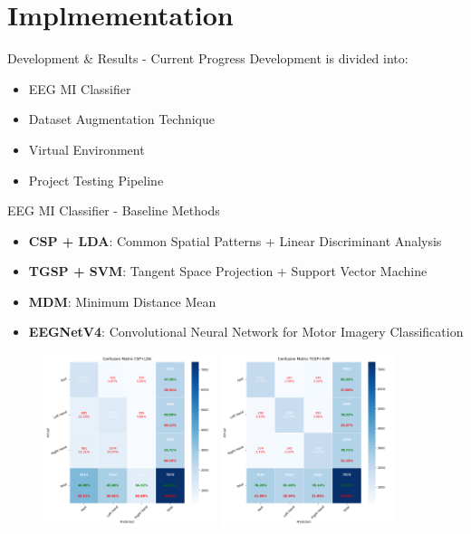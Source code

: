 \section{Implmementation}
\begin{frame}{Development \& Results - Current Progress}
Development is divided into:
\begin{itemize}
    \item EEG MI Classifier
    \item Dataset Augmentation Technique
    \item Virtual Environment
    \item Project Testing Pipeline
\end{itemize}
\end{frame}

\begin{frame}{EEG MI Classifier - Baseline Methods}
    \begin{minipage}[c]{.65\textwidth}
        \begin{itemize}
            \item \textbf{CSP + LDA}: Common Spatial Patterns + Linear Discriminant Analysis
            \item \textbf{TGSP + SVM}: Tangent Space Projection + Support Vector Machine
            \item \textbf{MDM}: Minimum Distance Mean
            \item \textbf{EEGNetV4}: Convolutional Neural Network for Motor Imagery Classification
        \end{itemize}        
    \end{minipage}
    \begin{minipage}[c]{.33\textwidth}
        \begin{figure}[htpb!]
            \centering
            \includegraphics[width=0.45\textwidth]{figures/classification/confusion_matrix_csp_lda}
            \includegraphics[width=0.45\textwidth]{figures/classification/confusion_matrix_tgsp_svm}

\end{figure}
\end{minipage}
\end{frame}

